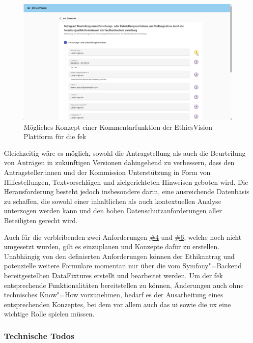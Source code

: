 \documentclass[a4paper,12pt,twoside]{scrreprt}
\begin{document}
\begin{figure}[ht]
    \centering
    \includegraphics[width=\linewidth]{thesis/images/Luidold_EthicsVision-Kommentar-Vorschau.pdf}
    \caption{Mögliches Konzept einer Kommentarfunktion der EthicsVision Plattform für die \ac{fek}}
    \label{fig:ethics-vision-kommentarfunktion}
\end{figure}

Gleichzeitig wäre es möglich, sowohl die Antragstellung als auch die Beurteilung von Anträgen in zukünftigen Versionen dahingehend zu verbessern, dass den Antragsteller:innen und der Kommission Unterstützung in Form von Hilfestellungen, Textvorschlägen und zielgerichteten Hinweisen geboten wird. Die Herausforderung besteht jedoch insbesondere darin, eine ausreichende Datenbasis zu schaffen, die sowohl einer inhaltlichen als auch kontextuellen Analyse unterzogen werden kann und den hohen Datenschutzanforderungen aller Beteiligten gerecht wird.

Auch für die verbleibenden zwei Anforderungen \hyperref[sub-sub-sec:abgeleitete-anforderungen-während-erstellung-einreichung]{\#4} und \hyperref[sub-sub-sec:abgeleitete-anforderungen-während-erstellung-einreichung]{\#6}, welche noch nicht umgesetzt wurden, gilt es einzuplanen und Konzepte dafür zu erstellen. Unabhängig von den definierten Anforderungen können der Ethikantrag und potenzielle weitere Formulare momentan nur über die vom Symfony"=Backend bereitgestellten DataFixtures erstellt und bearbeitet werden. Um der \ac{fek} entsprechende Funktionalitäten bereitstellen zu können, Änderungen auch ohne technisches Know"=How vorzunehmen, bedarf es der Ausarbeitung eines entsprechenden Konzeptes, bei dem vor allem auch das \ac{ui} sowie die \ac{ux} eine wichtige Rolle spielen müssen.

\subsubsection*{Technische Todos}
\end{document}
